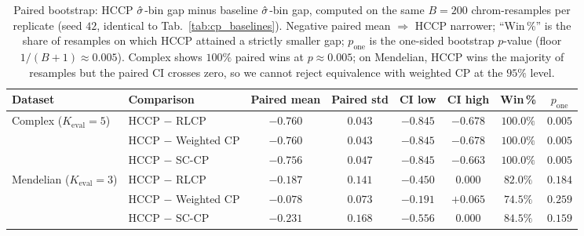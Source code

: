\begin{table}[h]
\centering
\small
\caption{Paired bootstrap: HCCP $\hat{\sigma}$-bin gap minus baseline $\hat{\sigma}$-bin gap, computed on the same $B = 200$ chrom-resamples per replicate (seed $42$, identical to Tab.~\ref{tab:cp_baselines}). Negative paired mean $\Rightarrow$ HCCP narrower; ``Win\,\%'' is the share of resamples on which HCCP attained a strictly smaller gap; $p_{\mathrm{one}}$ is the one-sided bootstrap $p$-value (floor $1/(B+1) \approx 0.005$). Complex shows $100\%$ paired wins at $p \approx 0.005$; on Mendelian, HCCP wins the majority of resamples but the paired CI crosses zero, so we cannot reject equivalence with weighted CP at the $95\%$ level.}
\label{tab:paired_bootstrap}
\setlength{\tabcolsep}{2pt}
\begin{tabular}{llcccccc}
\toprule
Dataset & Comparison & Paired mean & Paired std & CI low & CI high & Win\,\% & $p_{\mathrm{one}}$ \\
\midrule
\multirow{3}{*}{Complex ($K_{\mathrm{eval}} = 5$)}
 & HCCP $-$ RLCP        & $-0.760$ & $0.043$ & $-0.845$ & $-0.678$ & $\mathbf{100.0\%}$ & $\mathbf{0.005}$ \\
 & HCCP $-$ Weighted CP & $-0.760$ & $0.043$ & $-0.845$ & $-0.678$ & $\mathbf{100.0\%}$ & $\mathbf{0.005}$ \\
 & HCCP $-$ SC-CP       & $-0.756$ & $0.047$ & $-0.845$ & $-0.663$ & $\mathbf{100.0\%}$ & $\mathbf{0.005}$ \\
\midrule
\multirow{3}{*}{Mendelian ($K_{\mathrm{eval}} = 3$)}
 & HCCP $-$ RLCP        & $-0.187$ & $0.141$ & $-0.450$ & $0.000$  & $82.0\%$ & $0.184$ \\
 & HCCP $-$ Weighted CP & $-0.078$ & $0.073$ & $-0.191$ & $+0.065$ & $74.5\%$ & $0.259$ \\
 & HCCP $-$ SC-CP       & $-0.231$ & $0.168$ & $-0.556$ & $0.000$  & $84.5\%$ & $0.159$ \\
\bottomrule
\end{tabular}
\end{table}

